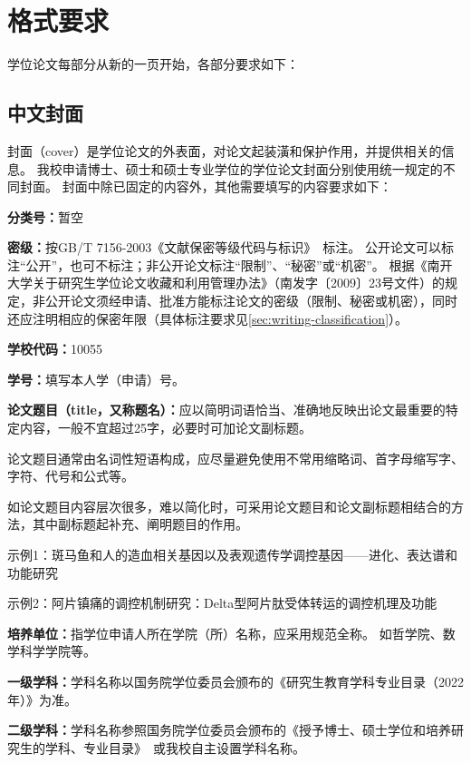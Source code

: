 \chapter{格式要求}
\label{chap:format-requirements}

学位论文每部分从新的一页开始，各部分要求如下：

\section{中文封面}
\label{sec:format-cover}

封面（cover）是学位论文的外表面，对论文起装潢和保护作用，并提供相关的信息。
我校申请博士、硕士和硕士专业学位的学位论文封面分别使用统一规定的不同封面。
封面中除已固定的内容外，其他需要填写的内容要求如下：

\textbf{分类号：}暂空

\textbf{密级：}按GB/T 7156-2003《文献保密等级代码与标识》~\cite{SCSF00000734}标注。
公开论文可以标注“公开”，也可不标注；非公开论文标注“限制”、“秘密”或“机密”。
根据《南开大学关于研究生学位论文收藏和利用管理办法》（南发字〔2009〕23号文件）的规定，非公开论文须经申请、批准方能标注论文的密级（限制、秘密或机密），同时还应注明相应的保密年限（具体标注要求见\ref{sec:writing-classification}）。

\textbf{学校代码：}10055

\textbf{学号：}填写本人学（申请）号。

\textbf{论文题目（title，又称题名）：}应以简明词语恰当、准确地反映出论文最重要的特定内容，一般不宜超过25字，必要时可加论文副标题。

论文题目通常由名词性短语构成，应尽量避免使用不常用缩略词、首字母缩写字、字符、代号和公式等。

如论文题目内容层次很多，难以简化时，可采用论文题目和论文副标题相结合的方法，其中副标题起补充、阐明题目的作用。

示例1：斑马鱼和人的造血相关基因以及表观遗传学调控基因——进化、表达谱和功能研究

示例2：阿片镇痛的调控机制研究：Delta型阿片肽受体转运的调控机理及功能

\textbf{培养单位：}指学位申请人所在学院（所）名称，应采用规范全称。
如哲学院、数学科学学院等。

\textbf{一级学科：}学科名称以国务院学位委员会颁布的《研究生教育学科专业目录（2022年）》为准。

\textbf{二级学科：}学科名称参照国务院学位委员会颁布的《授予博士、硕士学位和培养研究生的学科、专业目录》~\cite{REF00000002}或我校自主设置学科名称。

